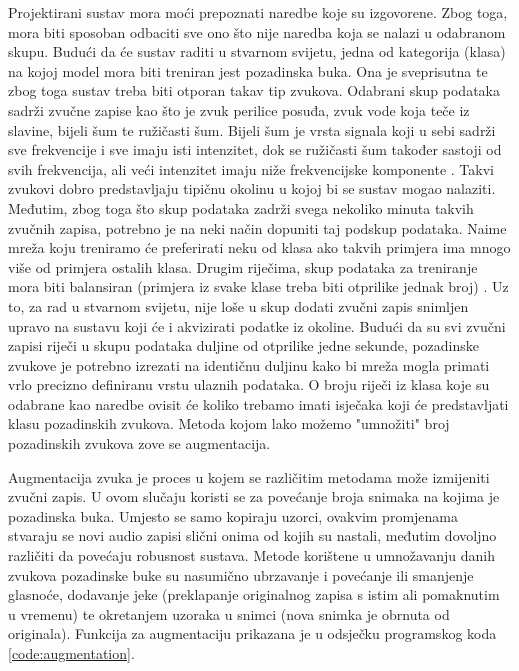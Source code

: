 Projektirani sustav mora moći prepoznati naredbe koje su izgovorene.
Zbog toga, mora biti sposoban odbaciti sve ono što nije naredba koja se
nalazi u odabranom skupu. Budući da će sustav raditi u stvarnom svijetu,
jedna od kategorija (klasa)
na kojoj model mora biti treniran jest pozadinska buka. Ona je sveprisutna te 
zbog toga sustav treba biti otporan takav tip zvukova. Odabrani skup podataka
sadrži zvučne zapise kao što je zvuk perilice posuđa, zvuk vode koja teče
iz slavine, bijeli šum te ružičasti šum. Bijeli šum je vrsta
signala koji u sebi sadrži sve frekvencije i sve imaju isti intenzitet,
dok se ružičasti šum također sastoji od svih frekvencija, ali veći intenzitet
imaju niže frekvencijske komponente \cite{noise}. Takvi zvukovi dobro predstavljaju
tipičnu okolinu u kojoj bi se sustav mogao nalaziti. Međutim, zbog toga što skup
podataka zadrži
svega nekoliko minuta takvih zvučnih zapisa, potrebno je na neki način dopuniti
taj podskup podataka. Naime mreža koju treniramo će preferirati neku od klasa
ako takvih primjera ima mnogo više od primjera ostalih klasa. Drugim riječima,
skup podataka za treniranje mora biti balansiran (primjera iz svake klase treba
biti otprilike jednak broj) \cite{balance}. Uz to, za rad u stvarnom svijetu, nije 
loše u skup
dodati zvučni zapis snimljen upravo na sustavu koji će i akvizirati podatke iz okoline.
Budući da su svi zvučni zapisi 
riječi u skupu podataka duljine od otprilike jedne sekunde, pozadinske zvukove
je potrebno izrezati na identičnu duljinu kako bi mreža mogla primati vrlo 
precizno definiranu vrstu ulaznih podataka. O broju riječi iz klasa koje su odabrane 
kao naredbe ovisit će koliko trebamo imati isječaka koji će predstavljati
klasu pozadinskih zvukova. Metoda kojom lako možemo "umnožiti" broj pozadinskih 
zvukova zove se augmentacija.

Augmentacija zvuka je proces u kojem se različitim metodama može izmijeniti 
zvučni zapis. U ovom slučaju koristi se za povećanje broja snimaka na kojima
je pozadinska buka. Umjesto se samo kopiraju uzorci, ovakvim promjenama stvaraju
se novi audio zapisi slični onima od kojih su nastali, međutim dovoljno različiti 
da povećaju robusnost sustava. Metode korištene u umnožavanju danih zvukova
pozadinske buke su nasumično ubrzavanje i povećanje ili smanjenje glasnoće,
dodavanje jeke (preklapanje originalnog zapisa s istim ali pomaknutim u vremenu)
te okretanjem uzoraka u snimci (nova snimka je obrnuta od originala). Funkcija
za augmentaciju prikazana je u odsječku programskog koda \ref{code:augmentation}.

